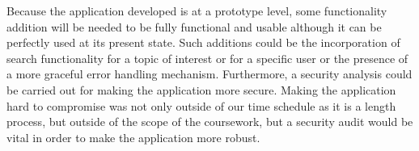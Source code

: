 \documentclass[12pt,a4paper,titlepage]{article}
\begin{document}
Because the application developed is at a prototype level, some functionality addition will be needed to be fully functional and usable although it can be perfectly used at its present state. Such additions could be the incorporation of search functionality for a topic of interest or for a specific user or the presence of a more graceful error handling mechanism. Furthermore, a security analysis could be carried out for making the application more secure. Making the application hard to compromise was not only outside of our time schedule as it is a length process, but outside of the scope of the coursework, but a security audit would be vital in order to make the application more robust.
\end{document}
